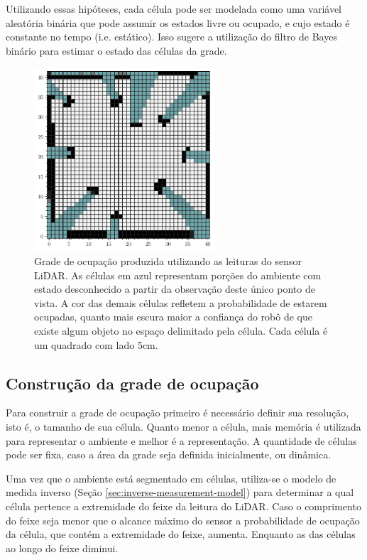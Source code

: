 Utilizando essas hipóteses, cada célula pode ser modelada como uma variável aleatória binária 
que pode assumir os estados livre ou ocupado, e cujo estado é constante 
no tempo (i.e. estático). Isso sugere a utilização 
do filtro de Bayes binário \cite[p.~94]{bongard2006probabilistic} para estimar o estado das células 
da grade.

\begin{figure}[]
  \centering
  \includegraphics[width=0.6\textwidth]{figs/grid_map_view_vec.pdf}
  \caption{Grade de ocupação produzida utilizando as leituras do sensor LiDAR. As células em azul representam porções do ambiente com estado 
  desconhecido a partir da observação deste único ponto de vista. A 
  cor das demais células refletem a probabilidade de estarem ocupadas,
  quanto mais escura maior a confiança do robô de que existe algum 
  objeto no espaço delimitado pela célula. Cada célula é um quadrado 
  com lado 5cm.}
  \label{fig:occuopancy-grid-represetation}
\end{figure}

\subsection{Construção da grade de ocupação}
Para construir a grade de ocupação primeiro é necessário definir sua 
resolução, isto é, o tamanho de sua célula. Quanto menor a célula, mais 
memória é utilizada para representar o ambiente e melhor é a 
representação. A quantidade de células pode ser fixa, caso a área da 
grade seja definida inicialmente, ou dinâmica.

Uma vez que o ambiente está segmentado em células, utiliza-se o modelo de 
medida inverso \invMeasurementModel (Seção \ref{sec:inverse-measurement-model}) para determinar a qual célula pertence 
a extremidade do feixe da leitura do LiDAR. Caso o comprimento do feixe 
seja menor que o alcance máximo do sensor a probabilidade de ocupação da 
célula, que contém a extremidade do feixe, aumenta. Enquanto as das 
células ao longo do feixe diminui.

